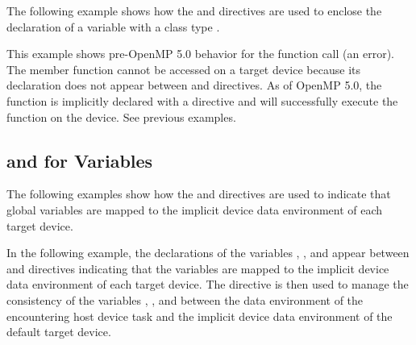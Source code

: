 \smallskip
{}
\smallskip
{}


The following example shows how the   and  
  directives are used to enclose the declaration 
of a variable  with a class type . 

This example shows pre-OpenMP 5.0 behavior for the  function call (an error).
The member function  cannot be accessed on a target device because its 
declaration does not appear between   and 
   directives. As of OpenMP 5.0, the
function is implicitly declared with a   directive 
and will successfully execute the function on the device.  See previous examples.

\cppspecificend

\subsection{  and    for Variables}
\label{subsec:declare_target_variables}

The following examples show how the   and  
  directives are used to indicate that global variables 
are mapped to the implicit device data environment of each target device.

In the following example, the declarations of the variables , , and  appear 
between   and    
directives indicating that the variables are mapped to the implicit device data 
environment of each target device. The   directive 
is then used to manage the consistency of the variables , , and  between the 
data environment of the encountering host device task and the implicit device data 
environment of the default target device.


